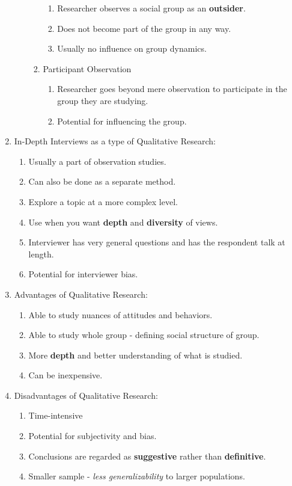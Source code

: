 \documentclass[12pt,a4paper]{article}
\begin{document}
\begin{enumerate}
\begin{enumerate}
\begin{enumerate}
\begin{enumerate}
				\item Researcher observes a social group as an \textbf{outsider}.
				\item Does not become part of the group in any way.
				\item Usually no influence on group dynamics.
			\end{enumerate}
			\item Participant Observation
			\begin{enumerate}
				\item Researcher goes beyond mere observation to participate in the group they are studying. 
				\item Potential for influencing the group.
			\end{enumerate}
		\end{enumerate}
	\end{enumerate}
	\item In-Depth Interviews as a type of Qualitative Research: 
	\begin{enumerate}
		\item Usually a part of observation studies. 
		\item Can also be done as a separate method.
		\item Explore a topic at a more complex level. 
		\item Use when you want \textbf{depth} and \textbf{diversity} of views. 
		\item Interviewer has very general questions and has the respondent talk at length. 
		\item Potential for interviewer bias. 
	\end{enumerate}
	\item Advantages of Qualitative Research: 
	\begin{enumerate}
		\item Able to study nuances of attitudes and behaviors.
		\item Able to study whole group - defining social structure of group.
		\item More \textbf{depth} and better understanding of what is studied.
		\item Can be inexpensive. 
	\end{enumerate}
	\item Disadvantages of Qualitative Research: 
	\begin{enumerate}
		\item Time-intensive
		\item Potential for subjectivity and bias.
		\item Conclusions are regarded as \textbf{suggestive} rather than \textbf{definitive}.
		\item Smaller sample - \textit{less generalizability} to larger populations.
	\end{enumerate}
\end{enumerate}
\end{document}
